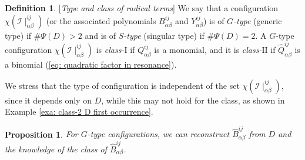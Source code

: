 \documentclass[10pt]{article}
\newtheorem{prop}{Proposition}%
\theoremstyle{remark}%
\theoremstyle{definition}%
\newtheorem{defn}{Definition}%
\begin{document}
\begin{defn}
\label{def: type and class of radical terms}[\textit{Type and class
of radical terms}] 
We say that a configuration $\chi(\mathcal{I}\mid_{\alpha\beta}^{ij})$
(or the associated polynomials $B_{\alpha\beta}^{ij}$ and $Y_{\alpha\beta}^{ij}$)
is of \textit{$G$-type} (generic type) if $\#\Psi(D)>2$ and is of
\textit{$S$-type} (singular type) if $\#\Psi(D)=2$. A $G$-type
configuration $\chi(\mathcal{I}\mid_{\alpha\beta}^{ij})$ is \textit{class-$\mathrm{I}$} if $Q_{\alpha\beta}^{ij}$ is a monomial, and it is \textit{class-$\mathrm{II}$ }if $\hat{Q}_{\alpha\beta}^{ij}$
is a binomial (\ref{eq: quadratic factor in resonance}). 
\end{defn}
We stress that the type of configuration is independent of the set $\chi(\mathcal{I}\mid_{\alpha\beta}^{ij})$, since it depends only on $D$, while this may not hold for the class, as shown in Example \ref{exa: class-2 D first occurrence}.
\begin{prop}
\label{prop: class-2, recover hat-B from D} For $G$-type configurations, we can reconstruct $\hat{B}_{\alpha\beta}^{ij}$ from $D$ and the knowledge of the class of $\hat{B}_{\alpha\beta}^{ij}$. 
\end{prop}
\end{document}
